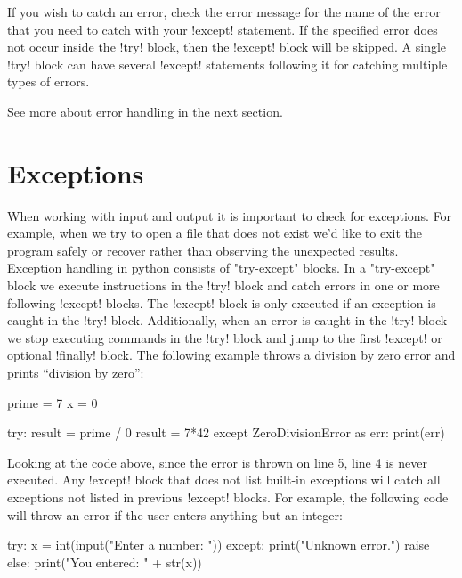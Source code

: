 \documentclass[11pt]{cselabheader}
\begin{document}
If you wish to catch an error, check the error message for the name of the error
that you need to catch with your \pythoninline!except! statement. If the
specified error does not occur inside the \pythoninline!try! block, then the
\pythoninline!except! block will be skipped. A single \pythoninline!try! block
can have several \pythoninline!except! statements following it for catching
multiple types of errors.

See more about error handling in the next section.

\pagebreak
\section{Exceptions}
When working with input and output it is important to check for exceptions.  For
example, when we try to open a file that does not exist we'd like to exit the
program safely or recover rather than observing the unexpected results.
Exception handling in python consists of "try-except" blocks.  In a "try-except"
block we execute instructions in the \pythoninline!try! block and catch errors
in one or more following \pythoninline!except! blocks.  The
\pythoninline!except! block is only executed if an exception is caught in the
\pythoninline!try! block.  Additionally, when an error is caught in the
\pythoninline!try! block we stop executing commands in the \pythoninline!try!
block and jump to the first \pythoninline!except! or optional
\pythoninline!finally! block.  The following example throws a division by zero
error and prints ``division by zero'':

\begin{python3code}
prime = 7
x = 0

try:
    result = prime / 0
    result = 7*42
except ZeroDivisionError as err:
    print(err)
\end{python3code}

Looking at the code above, since the error is thrown on line 5, line 4 is never
executed.  Any \pythoninline!except!  block that does not list built-in
exceptions will catch all exceptions not listed in previous
\pythoninline!except! blocks.  For example, the following code will throw an
error if the user enters anything but an integer:

\begin{python3code}
try:
    x = int(input("Enter a number: "))
except:
    print("Unknown error.")
    raise
else:
    print("You entered: " + str(x))
\end{python3code}
\end{document}
